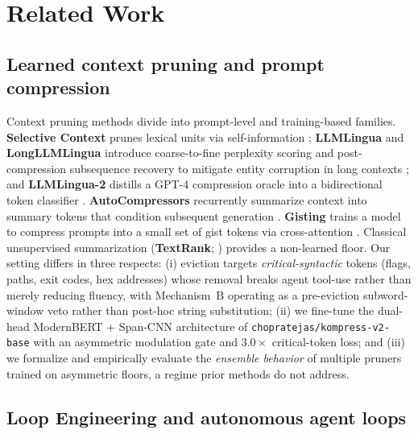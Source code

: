 \section{Related Work}
\label{sec:related}

\subsection{Learned context pruning and prompt compression}
\label{sec:rw:compression}

Context pruning methods divide into prompt-level and training-based families.
\textbf{Selective Context} prunes lexical units via self-information
\citep{li2023selective}; \textbf{LLMLingua} and \textbf{LongLLMLingua}
introduce coarse-to-fine perplexity scoring and post-compression subsequence
recovery to mitigate entity corruption in long contexts
\citep{jiang2023llmlingua,jiang2024longllmlingua}; and \textbf{LLMLingua-2}
distills a GPT-4 compression oracle into a bidirectional token classifier
\citep{pan2024llmlingua2}. \textbf{AutoCompressors} recurrently summarize
context into summary tokens that condition subsequent generation
\citep{chevalier2023autocompressors}. \textbf{Gisting} trains a model to
compress prompts into a small set of gist tokens via cross-attention
\citep{mu2023gisting}. Classical unsupervised summarization
(\textbf{TextRank}; \citealp{mihalcea2004textrank}) provides a non-learned
floor. Our setting differs in three respects: (i) eviction targets
\emph{critical-syntactic} tokens (flags, paths, exit codes, hex addresses)
whose removal breaks agent tool-use rather than merely reducing fluency, with
Mechanism~B operating as a pre-eviction subword-window veto rather than post-hoc
string substitution; (ii) we fine-tune the dual-head ModernBERT + Span-CNN
architecture of \texttt{chopratejas/kompress-v2-base} with an asymmetric
modulation gate and $3.0\times$ critical-token loss; and (iii) we formalize and
empirically evaluate the \emph{ensemble behavior} of multiple pruners trained
on asymmetric floors, a regime prior methods do not address.

\subsection{Loop Engineering and autonomous agent loops}
\label{sec:rw:loopeng}

